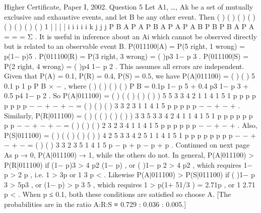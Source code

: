 \documentclass[a4paper,12pt]{article}
\begin{document}
Higher Certificate, Paper I, 2002. Question 5
Let A1, …, Ak be a set of mutually exclusive and exhaustive events, and let B be any
other event.
Then ( ) ( ) ( )
( )
( ) ( )
( ) ( )
1
| |
|
|
i i i i
i k
j j
j
P B A P A P B A P A
P A B
P B P B A P A
=
= =
Σ
.
It is useful in inference about an Ai which cannot be observed directly but is related to
an observable event B.
P(011100|A) = P(5 right, 1 wrong) = p(1− p)5 .
P(011100|R) = P(3 right, 3 wrong) = ( )p3 1− p 3 .
P(011100|S) = P(2 right, 4 wrong) = ( )p4 1− p 2 .
This assumes all errors are independent.
Given that P(A) = 0.1, P(R) = 0.4, P(S) = 0.5, we have P(A|011100) = ( )
( )
5 0.1 p 1 p
P B
× −
,
where ( ) ( ) ( ) ( ) P B = 0.1p 1− p 5 + 0.4 p3 1− p 3 + 0.5 p4 1− p 2 .
So P(A|011100) = ( )
( ( ) ( ) ( ) )
5
5 3 3 4 2
1
1 4 1 5 1
p p
p p p p p p
−
− + − + −
= ( )
( ) ( )
3
3 2 3
1
1 4 1 5
p
p p p p
−
− + − +
.
Similarly, P(R|011100) = ( )
( ( ) ( ) ( ) )
3 3
5 3 3 4 2
4 1
1 4 1 5 1
p p
p p p p p p
−
− + − + −
= ( )
( ) ( )
2
3 2 3
4 1
1 4 1 5
p p
p p p p
−
− + − +
.
Also, P(S|011100) = ( )
( ( ) ( ) ( ) )
4 2
5 3 3 4 2
5 1
1 4 1 5 1
p p
p p p p p p
−
− + − + −
=
( ) ( )
3
3 2 3
5
1 4 1 5
p
− p + p − p + p
.
Continued on next page
As p → 0, P(A|011100) → 1, while the others do not.
In general, P(A|011100) > P(R|011100) if (1− p)3 > 4 p2 (1− p) , or ( )1− p 2 > 4 p2 ,
which requires 1− p > 2 p , i.e. 1 > 3p or 1
3 p < .
Likewise P(A|011100) > P(S|011100) if ( )1− p 3 > 5p3 , or (1− p) > p 3 5 , which
requires 1 > p(1+ 51/3 ) = 2.71p , or 1
2.71
p < .
When p ≤ 0.1, both these conditions are satisfied so choose A.
[The probabilities are in the ratio A:R:S ≡ 0.729 : 0.036 : 0.005.]
\end{document}

